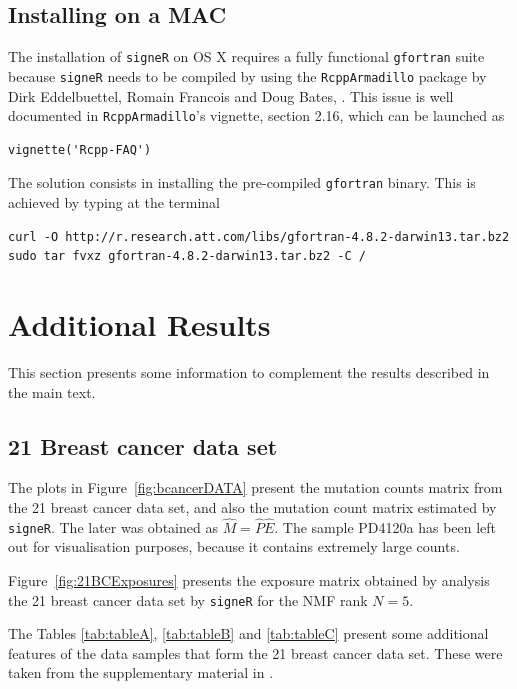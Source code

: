 \documentclass[11pt]{amsart}
\theoremstyle{definition}
\begin{document}
\subsection{Installing on a MAC} The installation of \texttt{signeR} on OS X requires a fully functional \texttt{gfortran} suite because \texttt{signeR} needs to be compiled by using the \texttt{RcppArmadillo} package by Dirk Eddelbuettel, Romain Francois and Doug Bates, \cite{E}. This issue is well documented in \texttt{RcppArmadillo}'s vignette, section 2.16, which can be launched as
\begin{lstlisting}[]
  vignette('Rcpp-FAQ')
\end{lstlisting}
The solution consists in installing the pre-compiled \texttt{gfortran} binary. This is achieved by typing at the terminal
\begin{lstlisting}[]
curl -O http://r.research.att.com/libs/gfortran-4.8.2-darwin13.tar.bz2
sudo tar fvxz gfortran-4.8.2-darwin13.tar.bz2 -C /
\end{lstlisting}



\section{Additional Results}
This section presents some information to complement the results
described in the main text.

\subsection{21 Breast cancer data set}
The plots in Figure~\ref{fig:bcancerDATA} present the mutation
counts matrix from the 21 breast cancer data set, and also the
mutation count matrix estimated by \texttt{signeR}. The later was
obtained as $\widehat M = \widehat P\widehat E$. The sample
PD4120a has been left out for visualisation purposes, because it
contains extremely large counts.


Figure~\ref{fig:21BCExposures} presents the exposure matrix obtained
by analysis the 21 breast cancer data set by \texttt{signeR} for the
NMF rank $N=5$.


The Tables \ref{tab:tableA}, \ref{tab:tableB} and \ref{tab:tableC}
present some additional features of the data samples that form the 21
breast cancer data set. These were taken from the supplementary
material in \cite{NCellFull}.
\end{document}
